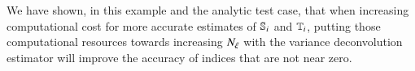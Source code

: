 We have shown, in this example and the analytic test case, that when increasing computational cost for more accurate estimates of $\S{i}$ and $\T{i}$, putting those computational resources towards increasing $\Nxi$ with the variance deconvolution estimator will improve the accuracy of indices that are not near zero.
